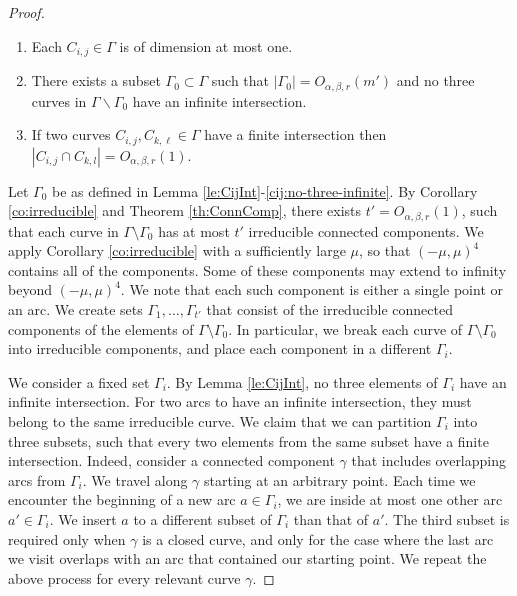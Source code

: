 \documentclass[11pt]{article}
\theoremstyle{definition}
\newcommand{\curves}{\Gamma}
\begin{document}
\begin{proof}
\begin{lemma}[store=leCijInt]\label{le:CijInt}
\begin{enumerate}[label=(\alph*)]
\item \label{cij:curve} Each $C_{i,j} \in \curves$ is of dimension at most one.
\item \label{cij:no-three-infinite} There exists a subset $\Gamma_0\subset \Gamma$ such that  $|\Gamma_0|=O_{\alpha,\beta, r}(m')$ and no three curves in $\Gamma\backslash \Gamma_0$ have an infinite intersection.
\item\label{cij:finite-small} If two curves $C_{i,j},C_{k,\ell}\in \Gamma$ have a finite intersection then $|C_{i,j}\cap C_{k,l}| = O_{\alpha, \beta, r}(1)$. 
\end{enumerate}
\end{lemma}

Let $\curves_0$ be as defined in Lemma \ref{le:CijInt}-\ref{cij:no-three-infinite}.  
By Corollary \ref{co:irreducible} and Theorem \ref{th:ConnComp}, there exists $t'=O_{\alpha,\beta,r}(1)$, such that each curve in $\curves\setminus\curves_0$ has at most $t'$ irreducible connected components.
We apply Corollary \ref{co:irreducible} with a sufficiently large $\mu$, so that $(-\mu, \mu)^4$ contains all of the components. Some of these components may extend to infinity beyond $(-\mu, \mu)^4$.
We note that each such component is either a single point or an arc. 
We create sets $\curves_1,\ldots,\curves_{t'}$ that consist of the irreducible connected components of the elements of $\curves\setminus\curves_0$.
In particular, we break each curve of $\curves\setminus\curves_0$ into irreducible components, and place each component in a different $\curves_i$.

We consider a fixed set $\curves_i$.
By Lemma \ref{le:CijInt}, no three elements of $\curves_i$ have an infinite intersection. 
For two arcs to have an infinite intersection, they must belong to the same irreducible curve. 
We claim that we can partition $\curves_i$ into three subsets, such that every two elements from the same subset have a finite intersection. 
Indeed, consider a connected component $\gamma$ that includes overlapping arcs from $\curves_i$. 
We travel along $\gamma$ starting at an arbitrary point. 
Each time we encounter the beginning of a new arc $a\in \curves_i$, we are inside at most one other arc $a'\in \curves_i$. 
We insert $a$ to a different subset of $\curves_i$ than that of $a'$.
The third subset is required only when $\gamma$ is a closed curve, and only for the case where the last arc we visit overlaps with an arc that contained our starting point. 
We repeat the above process for every relevant curve $\gamma$. 


\end{proof}
\end{document}
